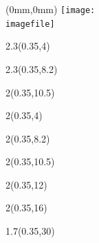 \begin{textblock*}{\paperwidth}(0mm,0mm)
  \texttt{[image: \\imagefile]}
\end{textblock*}

\begin{textblock*}{2.3\TPHorizModule}(0.35\TPHorizModule,4\TPVertModule)
  \textcolor{white}{\titlefmt}
\end{textblock*}

\begin{textblock*}{2.3\TPHorizModule}(0.35\TPHorizModule,8.2\TPVertModule)
  \textcolor{white}{\parttitlefmt}
\end{textblock*}

\begin{textblock*}{2\TPHorizModule}(0.35\TPHorizModule,10.5\TPVertModule)
  \textcolor{white}{\authorfmt}
\end{textblock*}

\null\cleardoublepage


\begin{textblock*}{2\TPHorizModule}(0.35\TPHorizModule,4\TPVertModule)
  \titlefmt
\end{textblock*}

\begin{textblock*}{2\TPHorizModule}(0.35\TPHorizModule,8.2\TPVertModule)
  \parttitlefmt
\end{textblock*}

\begin{textblock*}{2\TPHorizModule}(0.35\TPHorizModule,10.5\TPVertModule)
  \authorfmt
\end{textblock*}

\begin{textblock*}{2\TPHorizModule}(0.35\TPHorizModule,12\TPVertModule)
  \affiliation
\end{textblock*}

\begin{textblock*}{2\TPHorizModule}(0.35\TPHorizModule,16\TPVertModule)
  \collaboration
\end{textblock*}

\begin{textblock*}{1.7\TPHorizModule}(0.35\TPHorizModule,30\TPVertModule)
  \edition
\end{textblock*}
\endgroup
